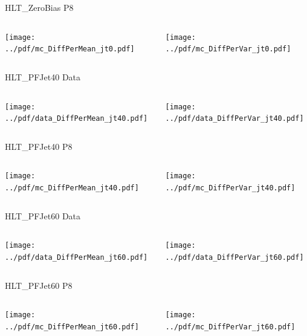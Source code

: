 \documentclass[9pt]{beamer}
\begin{document}
\begin{frame}[t]{HLT\_ZeroBias P8}
\begin{columns}[T]
  \begin{column}{.5\textwidth}
  \texttt{[image: ../pdf/mc\_DiffPerMean\_jt0.pdf]}
  \end{column}
  \begin{column}{.5\textwidth}
  \texttt{[image: ../pdf/mc\_DiffPerVar\_jt0.pdf]}
  \end{column}
\end{columns}
\end{frame}

\begin{frame}[t]{HLT\_PFJet40 Data}
\begin{columns}[T]
  \begin{column}{.5\textwidth}
  \texttt{[image: ../pdf/data\_DiffPerMean\_jt40.pdf]}
  \end{column}
  \begin{column}{.5\textwidth}
  \texttt{[image: ../pdf/data\_DiffPerVar\_jt40.pdf]}
  \end{column}
\end{columns}
\end{frame}

\begin{frame}[t]{HLT\_PFJet40 P8}
\begin{columns}[T]
  \begin{column}{.5\textwidth}
  \texttt{[image: ../pdf/mc\_DiffPerMean\_jt40.pdf]}
  \end{column}
  \begin{column}{.5\textwidth}
  \texttt{[image: ../pdf/mc\_DiffPerVar\_jt40.pdf]}
  \end{column}
\end{columns}
\end{frame}

\begin{frame}[t]{HLT\_PFJet60 Data}
\begin{columns}[T]
  \begin{column}{.5\textwidth}
  \texttt{[image: ../pdf/data\_DiffPerMean\_jt60.pdf]}
  \end{column}
  \begin{column}{.5\textwidth}
  \texttt{[image: ../pdf/data\_DiffPerVar\_jt60.pdf]}
  \end{column}
\end{columns}
\end{frame}

\begin{frame}[t]{HLT\_PFJet60 P8}
\begin{columns}[T]
  \begin{column}{.5\textwidth}
  \texttt{[image: ../pdf/mc\_DiffPerMean\_jt60.pdf]}
  \end{column}
  \begin{column}{.5\textwidth}
  \texttt{[image: ../pdf/mc\_DiffPerVar\_jt60.pdf]}
  \end{column}
\end{columns}
\end{frame}
\end{document}
